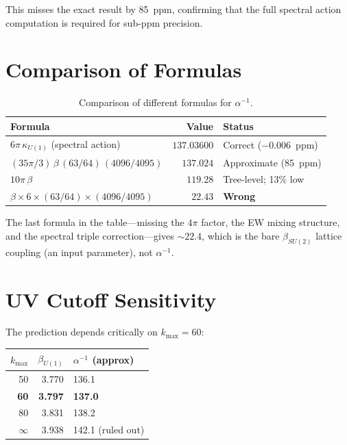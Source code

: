 \documentclass[12pt,a4paper]{article}
\begin{document}
This misses the exact result by 85~ppm, confirming that the full spectral
action computation is required for sub-ppm precision.

\section{Comparison of Formulas}

\begin{table}[h]
\centering
\caption{Comparison of different formulas for $\alpha^{-1}$.}
\renewcommand{\arraystretch}{1.3}
\begin{tabular}{lrl}
\toprule
\textbf{Formula} & \textbf{Value} & \textbf{Status} \\
\midrule
$6\pi\,\kappa_{U(1)}$ (spectral action) & $137.03600$ & Correct ($-0.006$~ppm) \\
$(35\pi/3)\,\beta\,(63/64)\,(4096/4095)$ & $137.024$ & Approximate (85~ppm) \\
$10\pi\,\beta$ & $119.28$ & Tree-level; 13\% low \\
$\beta \times 6 \times (63/64) \times (4096/4095)$ & $22.43$ & \textbf{Wrong} \\
\bottomrule
\end{tabular}
\end{table}

The last formula in the table---missing the $4\pi$ factor, the EW mixing
structure, and the spectral triple correction---gives $\sim 22.4$, which
is the bare $\beta_{SU(2)}$ lattice coupling (an input parameter),
not $\alpha^{-1}$.

\section{UV Cutoff Sensitivity}

The prediction depends critically on $k_{\max} = 60$:

\begin{center}
\renewcommand{\arraystretch}{1.2}
\begin{tabular}{rrl}
\toprule
$k_{\max}$ & $\beta_{U(1)}$ & $\alpha^{-1}$ (approx) \\
\midrule
50 & 3.770 & 136.1 \\
\textbf{60} & \textbf{3.797} & \textbf{137.0} \\
80 & 3.831 & 138.2 \\
$\infty$ & 3.938 & 142.1 (ruled out) \\
\bottomrule
\end{tabular}
\end{center}
\end{document}

